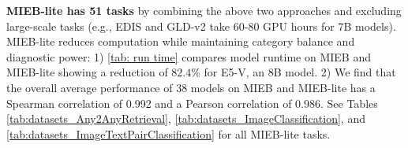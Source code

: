\begin{table}[t]
\centering
{}
\caption{\textbf{MIEB vs. MIEB-lite runtime comparison.}}
\label{tab: run time}
\end{table}

\textbf{MIEB-lite has 51 tasks} by combining the above two approaches and excluding large-scale tasks (e.g., EDIS and GLD-v2 take 60-80 GPU hours for 7B models). MIEB-lite reduces computation while maintaining category balance and diagnostic power: 1) \autoref{tab: run time} compares model runtime on MIEB and MIEB-lite showing a reduction of $82.4\%$ for E5-V, an 8B model. 2) We find that the overall average performance of 38 models on MIEB and MIEB-lite has a Spearman correlation of 0.992 and a Pearson correlation of 0.986. See Tables \ref{tab:datasets_Any2AnyRetrieval}, \ref{tab:datasets_ImageClassification}, and \ref{tab:datasets_ImageTextPairClassification} for all MIEB-lite tasks. 